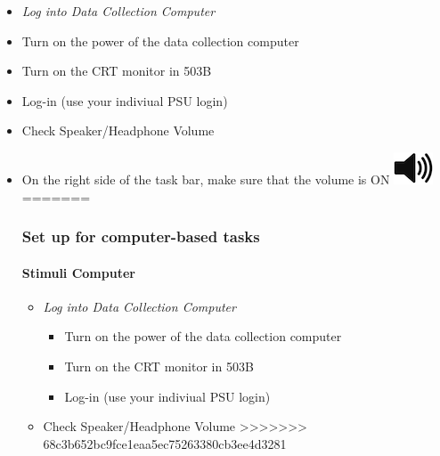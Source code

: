\documentclass[]{article}
\providecommand{\tightlist}{%
  \setlength{\itemsep}{0pt}\setlength{\parskip}{0pt}}
\let\oldparagraph\paragraph
\renewcommand{\paragraph}[1]{\oldparagraph{#1}\mbox{}}
\begin{document}
\begin{itemize}
\item
  \emph{Log into Data Collection Computer}
\item
  Turn on the power of the data collection computer
\item
  Turn on the CRT monitor in 503B
\item
  Log-in (use your indiviual PSU login)
\item
  Check Speaker/Headphone Volume
\item
  On the right side of the task bar, make sure that the volume is ON
  \includegraphics{images/volume_on.png}
=======
\hypertarget{set-up-for-computer-based-tasks}{%
\subsubsection{Set up for computer-based
tasks}\label{set-up-for-computer-based-tasks}}

\hypertarget{stimuli-computer}{%
\paragraph{Stimuli Computer}\label{stimuli-computer}}

\begin{itemize}
\tightlist
\item
  \emph{Log into Data Collection Computer}

  \begin{itemize}
  \tightlist
  \item
    Turn on the power of the data collection computer
  \item
    Turn on the CRT monitor in 503B
  \item
    Log-in (use your indiviual PSU login)
  \end{itemize}
\item
  Check Speaker/Headphone Volume
>>>>>>> 68c3b652bc9fce1eaa5ec75263380cb3ee4d3281


\end{itemize}
\end{itemize}
\end{document}
